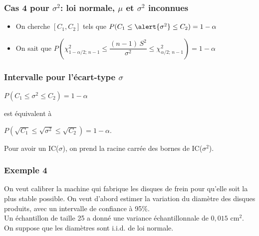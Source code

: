 \documentclass{BeamerTemplate}
\begin{document}
\begin{frame}[t]
 \frametitle{Cas 4 pour $\sigma^2$: loi normale, $\mu$ et $\sigma^2$ inconnues}

 \begin{itemize} \itemsep3mm
\item On cherche $[C_1, C_2]$ tels que $P(C_1\le \alert{\sigma^2} \le C_2)=1-\alpha$
\item On sait que $P\left(\chi^2_{1-\alpha/2;\,n-1}\le \dfrac{(n-1)\,S^2}{\sigma^2}\le \chi^2_{\alpha/2;\,n-1}\right)=1-\alpha$
\end{itemize}


\end{frame}

\begin{frame}[t]
 \frametitle{Intervalle pour l'écart-type $\sigma$}

  $P\left(C_1\le \sigma^2\le C_2\right)=1- \alpha $
  \bigskip

  est équivalent à
    \bigskip

  $P\left(\sqrt{C_1}\le \sqrt{\sigma^2}\le\sqrt{C_2}\right)=1 - \alpha $.
    \bigskip

  Pour avoir un IC($\sigma$), on prend la racine carrée des bornes de IC($\sigma^2$).

\end{frame}

\begin{frame}[t]
 \frametitle{Exemple 4}

 {\small
 On veut calibrer la machine qui fabrique les disques de frein pour qu'elle soit la plus stable possible. On veut d'abord estimer la variation du diamètre des disques produits, avec un intervalle de confiance  à 95\%.\\

 Un échantillon de taille 25  a donné une variance échantillonnale de $0,015$ cm$^2$.  On suppose que les diamètres sont i.i.d. de loi normale.}

\end{frame}
\end{document}
